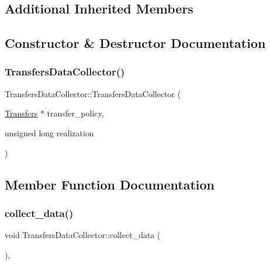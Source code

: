 \subsection*{Additional Inherited Members}


\subsection{Constructor \& Destructor Documentation}
\mbox{\label{classTransfersDataCollector_a757289856b49a212a16b6263bfab8b7d}} 
\subsubsection{\texorpdfstring{Transfers\+Data\+Collector()}{TransfersDataCollector()}}
{\footnotesize\ttfamily Transfers\+Data\+Collector\+::\+Transfers\+Data\+Collector (\begin{DoxyParamCaption}\item[{\mbox{\hyperlink{classTransfers}{Transfers}} $\ast$}]{transfer\+\_\+policy,  }\item[{unsigned long}]{realization }\end{DoxyParamCaption})}



\subsection{Member Function Documentation}
\mbox{\label{classTransfersDataCollector_a2f5c4427699aab547ea0d3b74993752b}} 
\subsubsection{\texorpdfstring{collect\+\_\+data()}{collect\_data()}}
{\footnotesize\ttfamily void Transfers\+Data\+Collector\+::collect\+\_\+data (\begin{DoxyParamCaption}{ }\end{DoxyParamCaption})\hspace{0.3cm}{\ttfamily [override]}, {\ttfamily [virtual]}}



